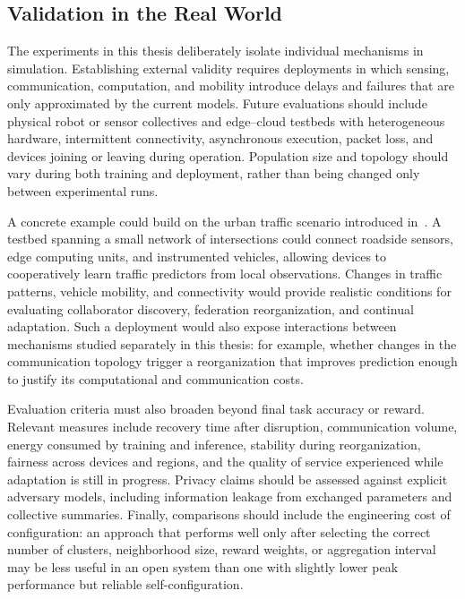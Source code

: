 \subsection{Validation in the Real World}

The experiments in this thesis deliberately isolate individual mechanisms in simulation.
%
Establishing external validity requires deployments in which sensing, communication, computation,
 and mobility introduce delays and failures that are only approximated by the current models.
%
Future evaluations should include physical robot or sensor collectives
 and edge--cloud testbeds with heterogeneous hardware, intermittent connectivity,
 asynchronous execution, packet loss, and devices joining or leaving during operation.
%
Population size and topology should vary during both training
 and deployment, rather than being changed only between experimental runs.

A concrete example could build on the urban traffic scenario 
 introduced in~.
%
A testbed spanning a small network of intersections could connect roadside sensors,
 edge computing units, and instrumented vehicles,
 allowing devices to cooperatively learn traffic predictors from local observations.
%
Changes in traffic patterns, vehicle mobility, and connectivity
 would provide realistic conditions for evaluating collaborator discovery,
 federation reorganization, and continual adaptation.
%
Such a deployment would also expose interactions between mechanisms studied separately in this thesis:
 for example, whether changes in the communication topology trigger a reorganization
 that improves prediction enough to justify its computational and communication costs.

Evaluation criteria must also broaden beyond final task accuracy or reward.
%
Relevant measures include recovery time after disruption, communication volume,
 energy consumed by training and inference, stability during reorganization,
 fairness across devices and regions, and the quality of service experienced
 while adaptation is still in progress.
%
Privacy claims should be assessed against explicit adversary models,
 including information leakage from exchanged parameters and collective summaries.
%
Finally,
 comparisons should include the engineering cost of configuration:
 an approach that performs well only after selecting the correct number of clusters,
 neighborhood size, reward weights, or aggregation interval may be less useful
 in an open system than one with slightly lower peak performance but reliable self-configuration.

